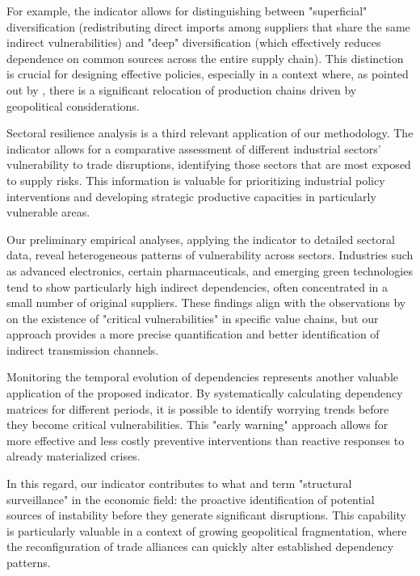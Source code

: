 \documentclass[final,1p,times,authoryear]{elsarticle}
\begin{document}
For example, the indicator allows for distinguishing between "superficial" diversification (redistributing direct imports among suppliers that share the same indirect vulnerabilities) and "deep" diversification (which effectively reduces dependence on common sources across the entire supply chain). This distinction is crucial for designing effective policies, especially in a context where, as pointed out by \citet{Alfaro2023}, there is a significant relocation of production chains driven by geopolitical considerations.

Sectoral resilience analysis is a third relevant application of our methodology. The indicator allows for a comparative assessment of different industrial sectors' vulnerability to trade disruptions, identifying those sectors that are most exposed to supply risks. This information is valuable for prioritizing industrial policy interventions and developing strategic productive capacities in particularly vulnerable areas.

Our preliminary empirical analyses, applying the indicator to detailed sectoral data, reveal heterogeneous patterns of vulnerability across sectors. Industries such as advanced electronics, certain pharmaceuticals, and emerging green technologies tend to show particularly high indirect dependencies, often concentrated in a small number of original suppliers. These findings align with the observations by \citet{Arriola2024} on the existence of "critical vulnerabilities" in specific value chains, but our approach provides a more precise quantification and better identification of indirect transmission channels.

Monitoring the temporal evolution of dependencies represents another valuable application of the proposed indicator. By systematically calculating dependency matrices for different periods, it is possible to identify worrying trends before they become critical vulnerabilities. This "early warning" approach allows for more effective and less costly preventive interventions than reactive responses to already materialized crises.

In this regard, our indicator contributes to what \citet{Ioannou2021} and \citet{Perez2021} term "structural surveillance" in the economic field: the proactive identification of potential sources of instability before they generate significant disruptions. This capability is particularly valuable in a context of growing geopolitical fragmentation, where the reconfiguration of trade alliances can quickly alter established dependency patterns.
\end{document}
